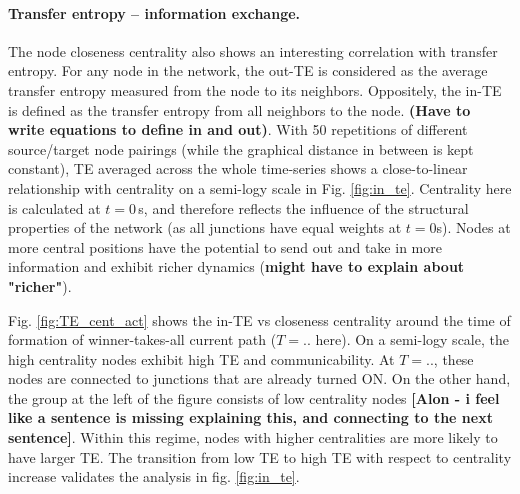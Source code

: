 \documentclass[fleqn,10pt,  amsmath,amssymb,aps]{wlscirep}
\begin{document}


\paragraph{Transfer entropy -- information exchange.}
The node closeness centrality also shows an interesting correlation with transfer entropy. For any node in the network, the out-TE is considered as the average transfer entropy measured from the node to its neighbors. Oppositely, the in-TE is defined as the transfer entropy from all neighbors to the node. \textbf{(Have to write equations to define in and out)}. With 50 repetitions of different source/target node pairings (while the graphical distance in between is kept constant), TE averaged across the whole time-series shows a close-to-linear relationship with centrality on a semi-logy scale in Fig. \ref{fig:in_te}. Centrality here is calculated at $t = 0\,$s, and therefore reflects the influence of the structural properties of the network (as all junctions have equal weights at $t = 0$s). Nodes at more central positions have the potential to send out and take in more information and exhibit richer dynamics (\textbf{might have to explain about "richer"}).

Fig. \ref{fig:TE_cent_act} shows the in-TE vs closeness centrality around the time of formation of winner-takes-all current path ($T = ..$ here). On a semi-logy scale, the high centrality nodes exhibit high TE and communicability. At $T = ..$, these nodes are connected to junctions that are already turned ON. On the other hand, the group at the left of the figure consists of low centrality nodes \textbf{[Alon - i feel like a sentence is missing explaining this, and connecting to the next sentence]}. Within this regime, nodes with higher centralities are more likely to have larger TE. The transition from low TE to high TE with respect to centrality increase validates the analysis in fig. \ref{fig:in_te}.
\end{document}
